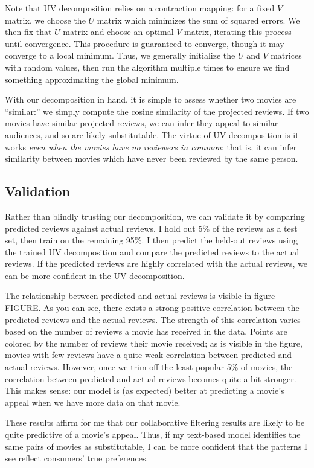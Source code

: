 \documentclass{article}
\begin{document}
Note that UV decomposition relies on a contraction mapping: for a fixed $V$ matrix, we choose the $U$ matrix which minimizes the sum of squared errors. We then fix that $U$ matrix and choose an optimal $V$ matrix, iterating this process until convergence. This procedure is guaranteed to converge, though it may converge to a local minimum. Thus, we generally initialize the $U$ and $V$ matrices with random values, then run the algorithm multiple times to ensure we find something approximating the global minimum. 

With our decomposition in hand, it is simple to assess whether two movies are ``similar:'' we simply compute the cosine similarity of the projected reviews. If two movies have similar projected reviews, we can infer they appeal to similar audiences, and so are likely substitutable. The virtue of UV-decomposition is it works \emph{even when the movies have no reviewers in common}; that is, it can infer similarity between movies which have never been reviewed by the same person.

\subsection{Validation}

Rather than blindly trusting our decomposition, we can validate it by comparing predicted reviews against actual reviews. I hold out 5\% of the reviews as a test set, then train on the remaining 95\%. I then predict the held-out reviews using the trained UV decomposition and compare the predicted reviews to the actual reviews. If the predicted reviews are highly correlated with the actual reviews, we can be more confident in the UV decomposition.

The relationship between predicted and actual reviews is visible in figure FIGURE. As you can see, there exists a strong positive correlation between the predicted reviews and the actual reviews. The strength of this correlation varies based on the number of reviews a movie has received in the data. Points are colored by the number of reviews their movie received; as is visible in the figure, movies with few reviews have a quite weak correlation between predicted and actual reviews. However, once we trim off the least popular 5\% of movies, the correlation between predicted and actual reviews becomes quite a bit stronger. This makes sense: our model is (as expected) better at predicting a movie's appeal when we have more data on that movie.

These results affirm for me that our collaborative filtering results are likely to be quite predictive of a movie's appeal. Thus, if my text-based model identifies the same pairs of movies as substitutable, I can be more confident that the patterns I see reflect consumers' true preferences. 
\end{document}
